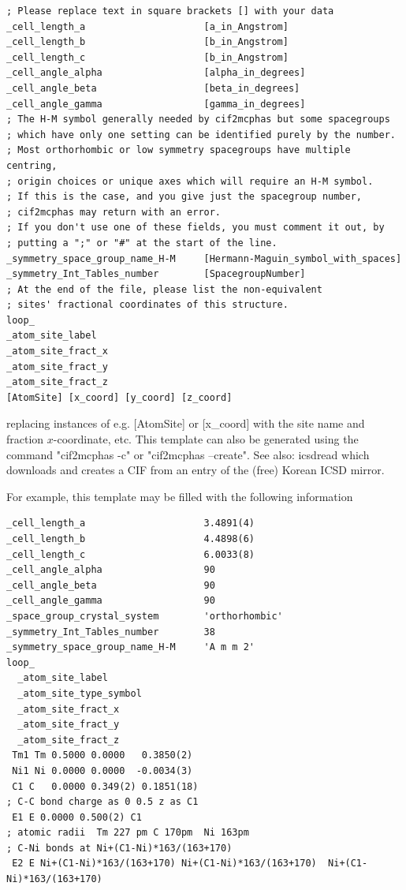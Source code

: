 \begin{description}
\begin{verbatim}
; Please replace text in square brackets [] with your data
_cell_length_a                     [a_in_Angstrom]
_cell_length_b                     [b_in_Angstrom]
_cell_length_c                     [b_in_Angstrom]
_cell_angle_alpha                  [alpha_in_degrees]
_cell_angle_beta                   [beta_in_degrees]
_cell_angle_gamma                  [gamma_in_degrees]
; The H-M symbol generally needed by cif2mcphas but some spacegroups
; which have only one setting can be identified purely by the number.
; Most orthorhombic or low symmetry spacegroups have multiple centring,
; origin choices or unique axes which will require an H-M symbol.
; If this is the case, and you give just the spacegroup number,
; cif2mcphas may return with an error.
; If you don't use one of these fields, you must comment it out, by
; putting a ";" or "#" at the start of the line.
_symmetry_space_group_name_H-M     [Hermann-Maguin_symbol_with_spaces]
_symmetry_Int_Tables_number        [SpacegroupNumber]
; At the end of the file, please list the non-equivalent
; sites' fractional coordinates of this structure.
loop_
_atom_site_label
_atom_site_fract_x
_atom_site_fract_y
_atom_site_fract_z
[AtomSite] [x_coord] [y_coord] [z_coord]
\end{verbatim}

replacing instances of e.g. [AtomSite] or [x\_coord] with the site name and fraction $x$-coordinate, etc.
This template can also be generated using the command "{\prg cif2mcphas -c}" or "{\prg cif2mcphas --create}".
See also: {\prg icsdread} which downloads and creates a CIF from an entry of the (free) Korean ICSD mirror.

For example, this template may be filled with the following information
\begin{verbatim}
_cell_length_a                     3.4891(4)
_cell_length_b                     4.4898(6)
_cell_length_c                     6.0033(8)
_cell_angle_alpha                  90
_cell_angle_beta                   90
_cell_angle_gamma                  90
_space_group_crystal_system        'orthorhombic'
_symmetry_Int_Tables_number        38
_symmetry_space_group_name_H-M     'A m m 2'
loop_
  _atom_site_label
  _atom_site_type_symbol
  _atom_site_fract_x
  _atom_site_fract_y
  _atom_site_fract_z
 Tm1 Tm 0.5000 0.0000   0.3850(2)     
 Ni1 Ni 0.0000 0.0000  -0.0034(3)      
 C1 C   0.0000 0.349(2) 0.1851(18)     
; C-C bond charge as 0 0.5 z as C1
 E1 E 0.0000 0.500(2) C1
; atomic radii  Tm 227 pm C 170pm  Ni 163pm
; C-Ni bonds at Ni+(C1-Ni)*163/(163+170)
 E2 E Ni+(C1-Ni)*163/(163+170) Ni+(C1-Ni)*163/(163+170)  Ni+(C1-Ni)*163/(163+170) 
\end{verbatim}


\end{description}
